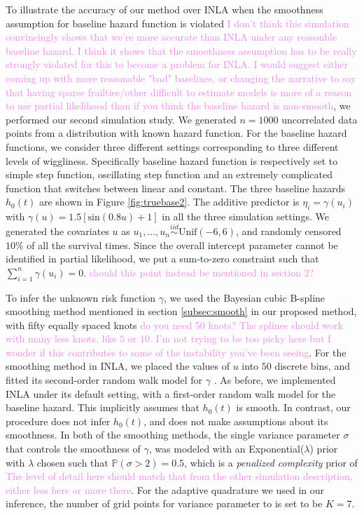 \documentclass[ba]{imsart}
\newcommand{\alex}[1]{\textcolor{violet}{{ }#1}}
\begin{document}
To illustrate the accuracy of our method over INLA when the smoothness assumption for baseline hazard function is violated\alex{I don't think this simulation convincingly shows that we're more accurate than INLA under any reasonble baseline hazard. I think it shows that the smoothness assumption has to be really strongly violated for this to become a problem for INLA. I would suggest either coming up with more reasonable "bad" baselines, or changing the narrative to say that having sparse frailties/other difficult to estimate models is more of a reason to use partial likelihood than if you think the baseline hazard is non-smooth}, we performed our second simulation study. We generated $n = 1000$ uncorrelated data points from a distribution with known hazard function. For the baseline hazard functions, we consider three different settings corresponding to three different levels of wiggliness. Specifically baseline hazard function is respectively set to simple step function, oscillating step function and an extremely complicated function that switches between linear and constant. The three baseline hazards $h_{0}(t)$ are shown in Figure \ref{fig:truebase2}. The additive predictor is $\eta_{i} = \gamma\left(u_{i}\right)$ with $\gamma(u) = 1.5 [ \text{sin}(0.8u) + 1 ]$ in all the three simulation settings. We generated the covariates $u$ as  $u_{1},\ldots,u_{n}\overset{iid}{\sim}\text{Unif}(-6,6)$, and randomly censored $10\%$ of all the survival times. Since the overall intercept parameter cannot be identified in partial likelihood, we put a sum-to-zero constraint such that $\sum_{i=1}^{n} \gamma{(u_i)} = 0$.\alex{should this point instead be mentioned in section 2?}

To infer the unknown risk function $\gamma$, we used the Bayesian cubic B-spline smoothing method mentioned in section \ref{subsec:smooth} in our proposed method, with fifty equally spaced knots\alex{do you need 50 knots? The splines should work with many less knots, like $5$ or $10$. I'm not trying to be too picky here but I wonder if this contributes to some of the instability you've been seeing}. For the smoothing method in INLA, we placed the values of $u$ into $50$ discrete bins, and fitted its second-order random walk model for $\gamma$ \citep{rw2}. As before, we implemented INLA under its default setting, with a first-order random walk model for the baseline hazard. This implicitly assumes that $h_{0}(t)$ is smooth. In contrast, our procedure does not infer $h_{0}(t)$, and does not make assumptions about its smoothness. In both of the smoothing methods, the single variance parameter $\sigma$ that controls the smoothness of $\gamma$, was modeled with an Exponential($\lambda$) prior with $\lambda$ chosen such that $\mathbb{P}\left( \sigma > 2\right) = 0.5$, which is a \emph{penalized complexity} prior of \cite{pcprior}\alex{The level of detail here should match that from the other simulation description, either less here or more there}. For the adaptive quadrature we used in our inference, the number of grid points for variance parameter to is set to be $K = 7$.
\end{document}
